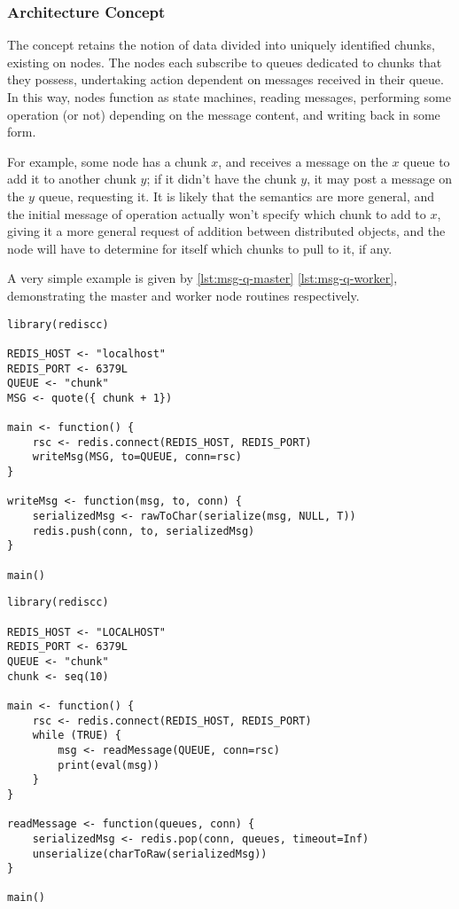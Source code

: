 \hypertarget{architecture-concept}{%
\subsubsection{Architecture Concept}\label{architecture-concept}}

The concept retains the notion of data divided into uniquely identified
chunks, existing on nodes. The nodes each subscribe to queues dedicated
to chunks that they possess, undertaking action dependent on messages
received in their queue. In this way, nodes function as state machines,
reading messages, performing some operation (or not) depending on the
message content, and writing back in some form.

For example, some node has a chunk \(x\), and receives a message on the
\(x\) queue to add it to another chunk \(y\); if it didn't have the
chunk \(y\), it may post a message on the \(y\) queue, requesting it. It
is likely that the semantics are more general, and the initial message
of operation actually won't specify which chunk to add to \(x\), giving
it a more general request of addition between distributed objects, and
the node will have to determine for itself which chunks to pull to it,
if any.

A very simple example is given by \cref{lst:msg-q-master}
\cref{lst:msg-q-worker}, demonstrating the master and worker node routines
respectively.

\hypertarget{lst:msg-q-master}{%
\label{lst:msg-q-master}}%
\begin{verbatim}
library(rediscc)

REDIS_HOST <- "localhost"
REDIS_PORT <- 6379L
QUEUE <- "chunk"
MSG <- quote({ chunk + 1})

main <- function() {
    rsc <- redis.connect(REDIS_HOST, REDIS_PORT)
    writeMsg(MSG, to=QUEUE, conn=rsc)
}

writeMsg <- function(msg, to, conn) {
    serializedMsg <- rawToChar(serialize(msg, NULL, T))
    redis.push(conn, to, serializedMsg)
}

main()
\end{verbatim}

\hypertarget{lst:msg-q-worker}{%
\label{lst:msg-q-worker}}%
\begin{verbatim}
library(rediscc)

REDIS_HOST <- "LOCALHOST"
REDIS_PORT <- 6379L
QUEUE <- "chunk"
chunk <- seq(10)

main <- function() {
    rsc <- redis.connect(REDIS_HOST, REDIS_PORT)
    while (TRUE) {
        msg <- readMessage(QUEUE, conn=rsc)
        print(eval(msg))
    }
}

readMessage <- function(queues, conn) {
    serializedMsg <- redis.pop(conn, queues, timeout=Inf)
    unserialize(charToRaw(serializedMsg))
}

main()
\end{verbatim}

